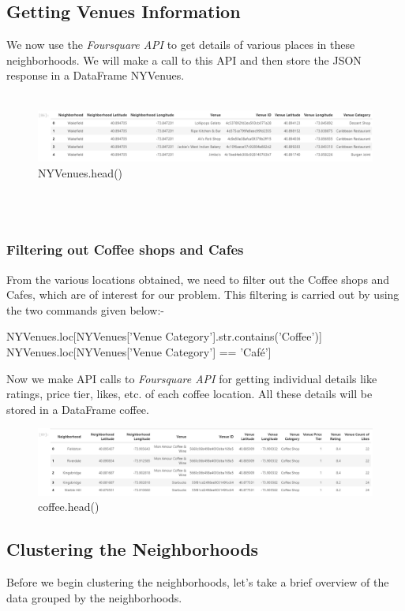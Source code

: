 \documentclass{article}
\begin{document}
\subsection{Getting Venues Information}
{We now use the \textit{Foursquare API} to get details of various places in these neighborhoods. We will make a call to this API and then store the JSON response in a DataFrame NYVenues.}\\\\
\begin{figure}[h]
\caption{NYVenues.head()}
\centering
\includegraphics[width=\textwidth]{images/Screenshot (38).png}
\end{figure}\\\\
\subsubsection{Filtering out Coffee shops and Cafes}
{From the various locations obtained, we need to filter out the Coffee shops and Cafes, which are of interest for our problem. This filtering is carried out by using the two commands given below:-}\\
\begin{center}
    {NYVenues.loc[NYVenues['Venue Category'].str.contains('Coffee')]}\\{NYVenues.loc[NYVenues['Venue Category'] == 'Café']}
\end{center}
{Now we make API calls to \textit{Foursquare API} for getting individual details like ratings, price tier, likes, etc. of each coffee location. All these details will be stored in a DataFrame coffee.}
\begin{figure}[h]
\caption{coffee.head()}
\centering
\includegraphics[width=\textwidth]{images/Screenshot (39).png}
\end{figure}
\subsection{Clustering the Neighborhoods}
{Before we begin clustering the neighborhoods, let's take a brief overview of the data grouped by the neighborhoods.}
\end{document}
